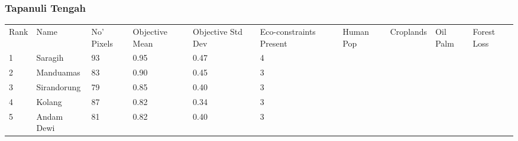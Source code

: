 \subsubsection{Tapanuli Tengah}
\begin{table}[ht]
\centering
\begingroup\fontsize{9pt}{10pt}\selectfont
\begin{tabular}{C{0.05\textwidth}C{0.15\textwidth}C{0.08\textwidth}C{0.08\textwidth}C{0.08\textwidth}C{0.08\textwidth}C{0.08\textwidth}C{0.08\textwidth}C{0.08\textwidth}C{0.08\textwidth}}
 Rank & Name & No' Pixels & Objective Mean & Objective Std Dev & Eco-constraints  Present & Human Pop & Croplands & Oil Palm & Forest Loss \\ 
 {1} & Saragih &  93 & \textcolor[HTML]{FFFFFF}{0.95} & \textcolor[HTML]{FFFFFF}{0.47} & \textcolor[HTML]{FFFFFF}{4} &  &  &  &  \\ 
  {2} & Manduamas &  83 & \textcolor[HTML]{FFFFFF}{0.90} & \textcolor[HTML]{FFFFFF}{0.45} & \textcolor[HTML]{000000}{3} &  &  &  &  \\ 
  {3} & Sirandorung &  79 & \textcolor[HTML]{000000}{0.85} & \textcolor[HTML]{000000}{0.40} & \textcolor[HTML]{000000}{3} &  &  &  &  \\ 
  {4} & Kolang &  87 & \textcolor[HTML]{000000}{0.82} & \textcolor[HTML]{000000}{0.34} & \textcolor[HTML]{000000}{3} &  &  &  &  \\ 
  {5} & Andam Dewi &  81 & \textcolor[HTML]{000000}{0.82} & \textcolor[HTML]{000000}{0.40} & \textcolor[HTML]{000000}{3} &  &  &  &  \\ 

\end{tabular}
\end{table}

